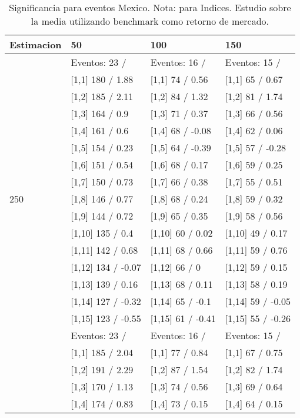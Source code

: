 \begin{table}

\caption{Significancia para eventos Mexico. Nota: para Indices. Estudio sobre la media utilizando benchmark como retorno de mercado.}
\centering
\begin{tabular}[t]{llll}
\toprule
Estimacion & 50 & 100 & 150\\
\midrule
 & Eventos:  23 / & Eventos:  16 / & Eventos:  15 /\\
 & {}[1,1] 180  / 1.88 & {}[1,1] 74  / 0.56 & {}[1,1] 65  / 0.67\\
 & {}[1,2] 185  / 2.11 & {}[1,2] 84  / 1.32 & {}[1,2] 81  / 1.74\\
 & {}[1,3] 164  / 0.9 & {}[1,3] 71  / 0.37 & {}[1,3] 66  / 0.56\\
 & {}[1,4] 161  / 0.6 & {}[1,4] 68  / -0.08 & {}[1,4] 62  / 0.06\\
\addlinespace
 & {}[1,5] 154  / 0.23 & {}[1,5] 64  / -0.39 & {}[1,5] 57  / -0.28\\
 & {}[1,6] 151  / 0.54 & {}[1,6] 68  / 0.17 & {}[1,6] 59  / 0.25\\
 & {}[1,7] 150  / 0.73 & {}[1,7] 66  / 0.38 & {}[1,7] 55  / 0.51\\
250 & {}[1,8] 146  / 0.77 & {}[1,8] 68  / 0.24 & {}[1,8] 59  / 0.32\\
 & {}[1,9] 144  / 0.72 & {}[1,9] 65  / 0.35 & {}[1,9] 58  / 0.56\\
\addlinespace
 & {}[1,10] 135  / 0.4 & {}[1,10] 60  / 0.02 & {}[1,10] 49  / 0.17\\
 & {}[1,11] 142  / 0.68 & {}[1,11] 68  / 0.66 & {}[1,11] 59  / 0.76\\
 & {}[1,12] 134  / -0.07 & {}[1,12] 66  / 0 & {}[1,12] 59  / 0.15\\
 & {}[1,13] 139  / 0.16 & {}[1,13] 68  / 0.11 & {}[1,13] 58  / 0.19\\
 & {}[1,14] 127  / -0.32 & {}[1,14] 65  / -0.1 & {}[1,14] 59  / -0.05\\
\addlinespace
 & {}[1,15] 123  / -0.55 & {}[1,15] 61  / -0.41 & {}[1,15] 55  / -0.26\\
 & Eventos:  23 / & Eventos:  16 / & Eventos:  15 /\\
 & {}[1,1] 185  / 2.04 & {}[1,1] 77  / 0.84 & {}[1,1] 67  / 0.75\\
 & {}[1,2] 191  / 2.29 & {}[1,2] 87  / 1.54 & {}[1,2] 82  / 1.74\\
 & {}[1,3] 170  / 1.13 & {}[1,3] 74  / 0.56 & {}[1,3] 69  / 0.64\\
\addlinespace
 & {}[1,4] 174  / 0.83 & {}[1,4] 73  / 0.15 & {}[1,4] 64  / 0.15\\

\end{tabular}
\end{table}
